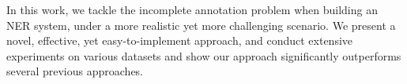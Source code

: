
In this work, we tackle the incomplete annotation problem when building an NER system, under a more realistic yet more challenging scenario. 
We present a novel, effective, yet easy-to-implement approach, and conduct extensive experiments on various datasets and show our approach significantly outperforms several previous approaches.




